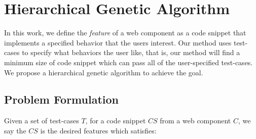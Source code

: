 
\section{Hierarchical Genetic Algorithm} 
In this work, we define the \emph{feature} of a web component as a code snippet that implements a specified behavior that the users interest. 
Our method uses test-cases to specify what behaviors the user like, that is, our method will find a minimum size of code snippet which can pass all of the user-specified test-cases. 
We propose a hierarchical genetic algorithm to achieve the goal. 

\subsection{Problem Formulation} 
\begin{definition}
Given a set of test-cases $T$, for a code snippet $CS$ from a web component $C$, we say the $CS$ is the desired features which satisfies:
\end{definition}

